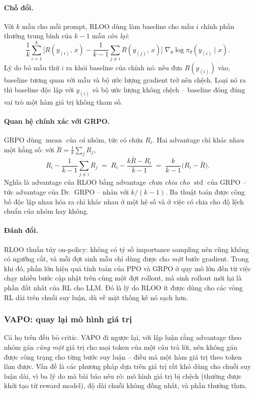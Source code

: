 \paragraph{Chỗ đổi.}
Với $k$ mẫu cho mỗi prompt, RLOO dùng làm baseline cho mẫu $i$ chính phần thưởng trung bình của $k-1$ mẫu \emph{còn lại}:
\[
\frac{1}{k}\sum_{i=1}^{k}\Big[R(y_{(i)},\, x) - \frac{1}{k-1}\sum_{j \ne i} R(y_{(j)},\, x)\Big]\;\nabla_\theta \log \pi_\theta(y_{(i)}\mid x).
\]
Lý do bỏ mẫu thứ $i$ ra khỏi baseline của chính nó: nếu đưa $R(y_{(i)})$ vào, baseline tương quan với mẫu và bộ ước lượng gradient trở nên chệch. Loại nó ra thì baseline độc lập với $y_{(i)}$ và bộ ước lượng không chệch -- baseline đóng đúng vai trò một hàm giá trị không tham số.

\paragraph{Quan hệ chính xác với GRPO.}
GRPO dùng $\operatorname{mean}$ của \emph{cả} nhóm, tức có chứa $R_i$. Hai advantage chỉ khác nhau một hằng số: với $\bar{R} = \frac{1}{k}\sum_j R_j$,
\[
R_i - \frac{1}{k-1}\sum_{j\ne i} R_j
\;=\; R_i - \frac{k\bar{R} - R_i}{k-1}
\;=\; \frac{k}{k-1}\big(R_i - \bar{R}\big).
\]
Nghĩa là advantage của RLOO bằng advantage \emph{chưa chia cho} $\operatorname{std}$ của GRPO -- tức advantage của Dr.~GRPO -- nhân với $k/(k-1)$. Ba thuật toán được công bố độc lập nhau hóa ra chỉ khác nhau ở một hệ số và ở việc có chia cho độ lệch chuẩn của nhóm hay không.

\paragraph{Đánh đổi.}
RLOO thuần túy on-policy: không có tỷ số importance sampling nên cũng không có ngưỡng cắt, và mỗi đợt sinh mẫu chỉ dùng được cho \emph{một} bước gradient. Trong khi đó, phần lớn hiệu quả tính toán của PPO và GRPO ở quy mô lớn đến từ việc chạy nhiều bước cập nhật trên cùng một đợt rollout, mà sinh rollout mới lại là phần đắt nhất của RL cho LLM. Đó là lý do RLOO ít được dùng cho các vòng RL dài trên chuỗi suy luận, dù về mặt thống kê nó sạch hơn.

\subsubsection{VAPO: quay lại mô hình giá trị}

Cả họ trên đều bỏ critic. VAPO \cite{yue2025vapo} đi ngược lại, với lập luận rằng advantage theo nhóm gán \emph{cùng một} giá trị cho mọi token của một câu trả lời, nên không gán được công trạng cho từng bước suy luận -- điều mà một hàm giá trị theo token làm được. Vấn đề là các phương pháp dựa trên giá trị rất khó dùng cho chuỗi suy luận dài, vì ba lý do mà bài báo nêu rõ: mô hình giá trị bị chệch (thường được khởi tạo từ reward model), độ dài chuỗi không đồng nhất, và phần thưởng thưa.

